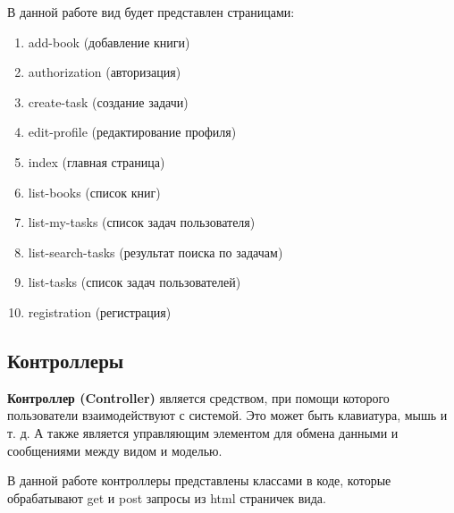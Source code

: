 В данной работе вид будет представлен страницами:

\begin{enumerate}
\item add-book (добавление книги)
\item authorization (авторизация)
\item create-task (создание задачи)
\item edit-profile (редактирование профиля)
\item index (главная страница)
\item list-books (список книг)
\item list-my-tasks (список задач пользователя)
\item list-search-tasks (результат поиска по задачам)
\item list-tasks (список задач пользователей)
\item registration (регистрация)
\end{enumerate}

\subsection{Контроллеры}

\textbf{Контроллер (Controller)} является средством, при помощи которого пользователи взаимодействуют с системой. Это может быть клавиатура, мышь и т. д. А также является управляющим элементом для обмена данными и сообщениями между видом и моделью.

В данной работе контроллеры представлены классами в коде, которые обрабатывают get и post запросы из html страничек вида.

